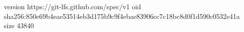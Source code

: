 version https://git-lfs.github.com/spec/v1
oid sha256:850e69b4eae53514eb3d175b9c9f4ebae83906cc7c18bc8d0f1d590c0532e41a
size 43840

